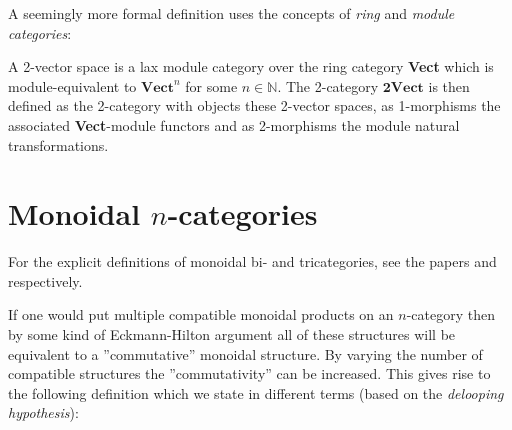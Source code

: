     A seemingly more formal definition uses the concepts of \textit{ring} and \textit{module categories}:
    \begin{adefinition}
        A 2-vector space is a lax module category over the ring category \textbf{Vect} which is module-equivalent to $\textbf{Vect}^n$ for some $n\in\mathbb{N}$. The 2-category $\textbf{2Vect}$ is then defined as the 2-category with objects these 2-vector spaces, as 1-morphisms the associated \textbf{Vect}-module functors and as 2-morphisms the module natural transformations.
    \end{adefinition}

\section{\texorpdfstring{Monoidal $n$-categories}{Monoidal n-categories}}\label{section:monoidal_n_cat}

    For the explicit definitions of monoidal bi- and tricategories, see the papers \cite{monbicat} and \cite{montricat} respectively.

    If one would put multiple compatible monoidal products on an $n$-category then by some kind of Eckmann-Hilton argument all of these structures will be equivalent to a ''commutative'' monoidal structure. By varying the number of compatible structures the ''commutativity'' can be increased. This gives rise to the following definition which we state in different terms (based on the \textit{delooping hypothesis}):

